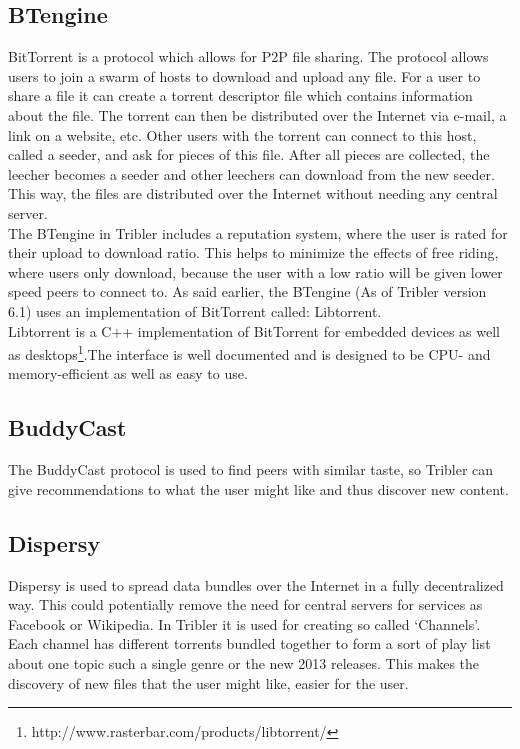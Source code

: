 \subsection{BTengine}
BitTorrent is a protocol which allows for P2P file sharing. The protocol allows users to join a swarm of hosts to download and upload any file. For a user to share a file it can create a torrent descriptor file which contains information about the file. The torrent can then be distributed over the Internet via e-mail, a link on a website, etc. Other users with the torrent can connect to this host, called a seeder, and ask for pieces of this file. After all pieces are collected, the leecher becomes a seeder and other leechers can download from the new seeder. This way, the files are distributed over the Internet without needing any central server.\\ 
The BTengine in Tribler includes a reputation system, where the user is rated for their upload to download ratio. This helps to minimize the effects of free riding, where users only download, because the user with a low ratio will be given lower speed peers to connect to. As said earlier, the BTengine (As of Tribler version 6.1) uses an implementation of BitTorrent called: Libtorrent.\\
Libtorrent is a C++ implementation of BitTorrent for embedded devices as well as desktops\footnote{http://www.rasterbar.com/products/libtorrent/}.The interface is well documented and is designed to be CPU- and memory-efficient as well as easy to use.

\subsection{BuddyCast}
The BuddyCast protocol is used to find peers with similar taste, so Tribler can give recommendations to what the user might like and thus discover new content. 

\subsection{Dispersy}
Dispersy is used to spread data bundles over the Internet in a fully decentralized way. This could potentially remove the need for central servers for services as Facebook or Wikipedia. In Tribler it is used for creating so called `Channels'. Each channel has different torrents bundled together to form a sort of play list about one topic such a single genre or the new 2013 releases. This makes the discovery of new files that the user might like, easier for the user.

